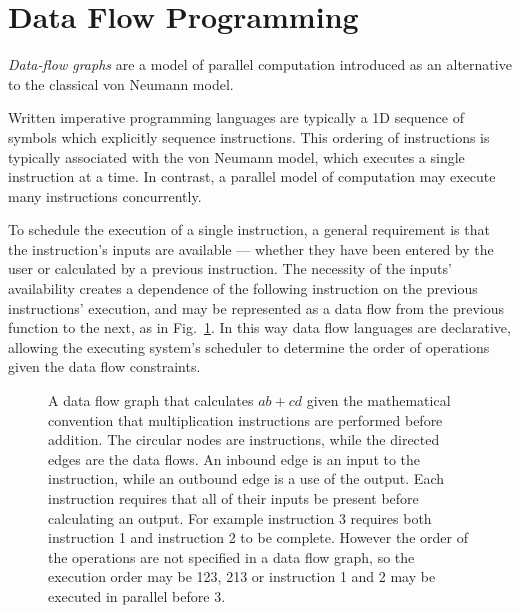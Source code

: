 
% 

\section{Data Flow Programming}
\label{s:dataFlowProgramming}

\emph{Data-flow graphs} are a model of parallel computation introduced as an alternative to the classical von Neumann model. 

Written imperative programming languages are typically a 1D sequence of symbols which explicitly sequence instructions. This ordering of instructions is typically associated with the von Neumann model, which executes a single instruction at a time. In contrast, a parallel model of computation may execute many instructions concurrently.

To schedule the execution of a single instruction, a general requirement is that the instruction's inputs are available --- whether they have been entered by the user or calculated by a previous instruction. The necessity of the inputs' availability creates a dependence of the following instruction on the previous instructions' execution, and may be represented as a data flow from the previous function to the next, as in Fig.~\ref{fig:dataFlowIntro}. In this way data flow languages are declarative, allowing the executing system's scheduler to determine the order of operations given the data flow constraints.

\begin{figure}
\centering
\def\svgwidth{0.4\columnwidth}
 
\caption[A data flow graph]{A data flow graph that calculates $ab+cd$ given the mathematical convention that multiplication instructions are performed before addition. The circular nodes are instructions, while the directed edges are the data flows. An inbound edge is an input to the instruction, while an outbound edge is a use of the output. Each instruction requires that all of their inputs be present before calculating an output. For example instruction 3 requires both instruction 1 and instruction 2 to be complete. However the order of the operations are not specified in a data flow graph, so the execution order may be 123, 213 or instruction 1 and 2 may be executed in parallel before 3.}
\label{fig:dataFlowIntro}
\end{figure}

